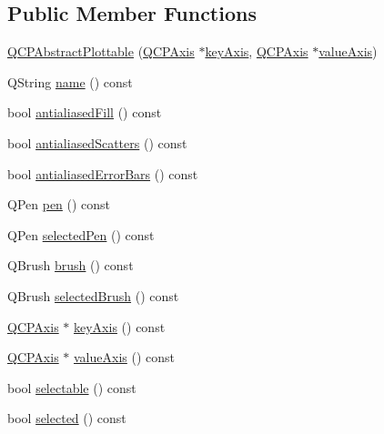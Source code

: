 \subsection*{Public Member Functions}
\begin{DoxyCompactItemize}
\item 
\hyperlink{class_q_c_p_abstract_plottable_af78a036e40db6f53a31abadc5323715a}{Q\-C\-P\-Abstract\-Plottable} (\hyperlink{class_q_c_p_axis}{Q\-C\-P\-Axis} $\ast$\hyperlink{class_q_c_p_abstract_plottable_a72c7a09c22963f2c943f07112b311103}{key\-Axis}, \hyperlink{class_q_c_p_axis}{Q\-C\-P\-Axis} $\ast$\hyperlink{class_q_c_p_abstract_plottable_a3106f9d34d330a6097a8ec5905e5b519}{value\-Axis})
\item 
Q\-String \hyperlink{class_q_c_p_abstract_plottable_a1affc1972938e4364a9325e4e4e4dcea}{name} () const 
\item 
bool \hyperlink{class_q_c_p_abstract_plottable_a68d1c358db03faae376ec47c589abf27}{antialiased\-Fill} () const 
\item 
bool \hyperlink{class_q_c_p_abstract_plottable_aefc379bcc011660a5371ecc6088a97eb}{antialiased\-Scatters} () const 
\item 
bool \hyperlink{class_q_c_p_abstract_plottable_a630cfb27ff99ab4373b09631748fcf4a}{antialiased\-Error\-Bars} () const 
\item 
Q\-Pen \hyperlink{class_q_c_p_abstract_plottable_a41d060007cc6b3037c9c04d22d0c0398}{pen} () const 
\item 
Q\-Pen \hyperlink{class_q_c_p_abstract_plottable_a006065572c5add883a944ea4cda699f3}{selected\-Pen} () const 
\item 
Q\-Brush \hyperlink{class_q_c_p_abstract_plottable_aa74cdceb9c7286ef116fbfa58e0326e7}{brush} () const 
\item 
Q\-Brush \hyperlink{class_q_c_p_abstract_plottable_a403745791879916431adc872b49207e5}{selected\-Brush} () const 
\item 
\hyperlink{class_q_c_p_axis}{Q\-C\-P\-Axis} $\ast$ \hyperlink{class_q_c_p_abstract_plottable_a72c7a09c22963f2c943f07112b311103}{key\-Axis} () const 
\item 
\hyperlink{class_q_c_p_axis}{Q\-C\-P\-Axis} $\ast$ \hyperlink{class_q_c_p_abstract_plottable_a3106f9d34d330a6097a8ec5905e5b519}{value\-Axis} () const 
\item 
bool \hyperlink{class_q_c_p_abstract_plottable_af895574da1ec0d050711b6c9deda296a}{selectable} () const 
\item 
bool \hyperlink{class_q_c_p_abstract_plottable_ab901903adcb0e29467d63de72340ab29}{selected} () const 

\end{DoxyCompactItemize}
